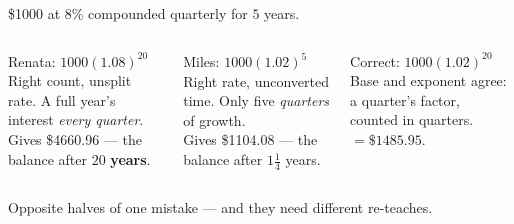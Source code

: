 \documentclass[aspectratio=169, 11pt]{beamer}
\begin{document}
\begin{frame}[t, plain]
  \begin{center}
    {\footnotesize \$1000 at $8\%$ compounded quarterly for $5$ years.}
  \end{center}
  \vspace{4pt}
  \begin{columns}[T]
    \begin{column}{0.32\textwidth}
      \begin{block}{Renata: $1000(1.08)^{20}$}
        \footnotesize Right count, unsplit rate. A full year's interest \emph{every quarter}.
        \\[3pt] Gives \$4660.96 --- the balance after $20$ \textbf{years}.
      \end{block}
    \end{column}
    \begin{column}{0.32\textwidth}
      \begin{block}{Miles: $1000(1.02)^{5}$}
        \footnotesize Right rate, unconverted time. Only five \emph{quarters} of growth.
        \\[3pt] Gives \$1104.08 --- the balance after $1\frac14$ years.
      \end{block}
    \end{column}
    \begin{column}{0.32\textwidth}
      \begin{block}{Correct: $1000(1.02)^{20}$}
        \footnotesize Base and exponent agree: a quarter's factor, counted in quarters.
        \\[3pt] $=\$1485.95$.
      \end{block}
    \end{column}
  \end{columns}
  \vspace{6pt}
  \begin{center}
    {\footnotesize Opposite halves of one mistake --- and they need different re-teaches.}
  \end{center}
\end{frame}
\end{document}
